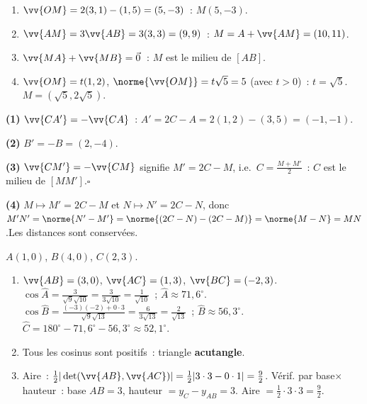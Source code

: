 
\begin{enumerate}
  \item $\vv{OM}=2(3,1)-(1,5)=(5,-3)$~: $M(5,-3)$.
  \item $\vv{AM}=3\vv{AB}=3(3,3)=(9,9)$~: $M=A+\vv{AM}=(10,11)$.
  \item $\vv{MA}+\vv{MB}=\vec{0}$~: $M$ est le milieu de $[AB]$.
  \item $\vv{OM}=t(1,2)$, $\norme{\vv{OM}}=t\sqrt{5}=5$ (avec $t>0$)~: $t=\sqrt{5}$.
        $M=(\sqrt{5},2\sqrt{5})$.
\end{enumerate}


\textbf{(1)} $\vv{CA'}=-\vv{CA}$~: $A'=2C-A=2(1,2)-(3,5)=(-1,-1)$.

\textbf{(2)} $B'=-B=(2,-4)$.

\textbf{(3)} $\vv{CM'}=-\vv{CM}$ signifie $M'=2C-M$, i.e.\ $C=\frac{M+M'}{2}$~:
$C$ est le milieu de $[MM']$.\hfill$\square$

\textbf{(4)} $M\mapsto M'=2C-M$ et $N\mapsto N'=2C-N$, donc
$M'N'=\norme{N'-M'}=\norme{(2C-N)-(2C-M)}=\norme{M-N}=MN$.\checkmark\quad Les distances sont conserv\'ees.


$A(1,0)$, $B(4,0)$, $C(2,3)$.
\begin{enumerate}
  \item $\vv{AB}=(3,0)$, $\vv{AC}=(1,3)$, $\vv{BC}=(-2,3)$.
        $\cos\hat{A}=\frac{3}{\sqrt{9}\sqrt{10}}=\frac{3}{3\sqrt{10}}=\frac{1}{\sqrt{10}}$~;
        $\hat{A}\approx71{,}6^{\circ}$.
        $\cos\hat{B}=\frac{(-3)(-2)+0\cdot3}{\sqrt{9}\sqrt{13}}=\frac{6}{3\sqrt{13}}=\frac{2}{\sqrt{13}}$~;
        $\hat{B}\approx56{,}3^{\circ}$.
        $\hat{C}=180^{\circ}-71{,}6^{\circ}-56{,}3^{\circ}\approx52{,}1^{\circ}$.
  \item Tous les cosinus sont positifs~: triangle \textbf{acutangle}.
  \item Aire~: $\frac{1}{2}|\det(\vv{AB},\vv{AC})|=\frac{1}{2}|3\cdot3-0\cdot1|=\frac{9}{2}$.
        V\'erif. par base$\times$hauteur~: base $AB=3$, hauteur $= y_C-y_{AB}=3$. Aire $=\frac{1}{2}\cdot3\cdot3=\frac{9}{2}$.\checkmark
\end{enumerate}

